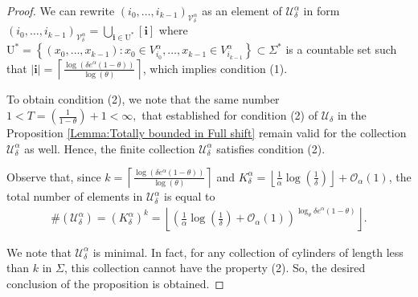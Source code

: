 \documentclass[10pt,a4paper]{amsart}
\def\U{\ensuremath{\mathcal U}}
\def\i{\textbf{i}}
\begin{document}
\begin{proof}
We can rewrite $(i_0,\ldots,i_{k-1})_{\mathcal{V}_\delta^{\alpha}}$ as an element of $\U_{\delta}^{\alpha}$ in form $(i_0,\ldots,i_{k-1})_{\mathcal{V}_\delta^{\alpha}}=\bigcup_{\i\in\mathrm{U^*}}[\textbf{i}]$ where $\mathrm{U^*}=\left\{ (x_0,\ldots,x_{k-1}):  x_0\in V_{i_0}^{\alpha},\ldots,x_{k-1}\in V_{i_{k-1}}^{\alpha}    \right\}\subset \Sigma^*$ is a countable set such that $|\textbf{i}|= \left\lceil\frac{\log(\delta e^\alpha(1-\theta))}{\log(\theta)}\right\rceil$, which implies condition (1). 
    


To obtain condition (2), we note that the same number $ 1<T=\left( \frac{1}{1-\theta} \right)+1<\infty,$ that established for condition (2) of $\U_\delta$ in the Proposition \ref{Lemma:Totally bounded in Full shift} remain valid for the collection $\U_{\delta}^{\alpha}$ as well.
Hence, the finite collection $\U_{\delta}^{\alpha}$ satisfies condition (2).

Observe that, since $k=\left\lceil \frac{\log(\delta e^{\alpha}(1-\theta))}{\log(\theta)}\right\rceil$ and $K_\delta^{\alpha}= \left\lfloor \frac{1}{\alpha} \log \left(\frac{1}{\delta}\right)\right\rfloor+\mathcal{O}_\alpha(1)$, the total number of elements in $\U_{\delta}^{\alpha}$ is equal to 
\begin{align*}
    \#(\U_{\delta}^{\alpha})=(K_\delta^{\alpha})^k= \left\lfloor\left( \frac{1}{\alpha} \log \left(\frac{1}{\delta}\right)+\mathcal{O}_\alpha(1)\right) ^ { \log_\theta{\delta e^\alpha(1-\theta)}}\right\rfloor.
\end{align*}



We note that $\U_{\delta}^{\alpha}$ is minimal. In fact, for any collection of cylinders of length less than $k$ in $\Sigma$, this collection cannot have the property (2). So, the desired conclusion of the proposition is obtained.
\end{proof}
\end{document}
